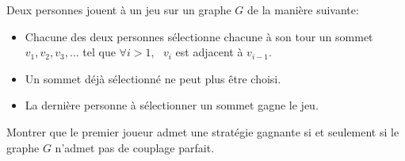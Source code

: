 
%
%
%
%
%
%
%
%


Deux personnes jouent à un jeu sur un graphe $G$ de la manière suivante: \\

\begin{itemize}
  \item Chacune des deux personnes sélectionne chacune à son tour un sommet $v_1, v_2, v_3, …$ tel que $\forall i > 1, \ \ \ v_i$ est adjacent à $v_{i-1}$.
  \item Un sommet déjà sélectionné ne peut plus être choisi.
  \item La dernière personne à sélectionner un sommet gagne le jeu.
\end{itemize}

Montrer que le premier joueur admet une stratégie gagnante si et seulement si le graphe $G$ n'admet pas de couplage parfait.
